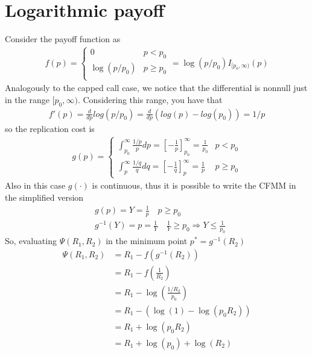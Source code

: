 \documentclass[12pt]{article}
\begin{document}
\section{Logarithmic payoff}
Consider the payoff function as
\begin{align*}
    f(p)=\begin{cases}
             0           & p<p_0     \\
             \log(p/p_0) & p\geq p_0 \\
         \end{cases} = \log(p/p_0) I_{[p_0,\infty)}(p)
\end{align*}
Analogously to the capped call case, we notice that the differential is nonnull just in the range $[p_0,\infty)$. Considering this range, you have that
\begin{align*}
    f'(p) =\frac{d}{dp} log(p/p_0) = \frac{d}{dp}\left(log(p)-log(p_0)\right) = 1/p
\end{align*}
so the replication cost is
\begin{align*}
    g(p) = \begin{cases}
               \int^\infty_{p_0} \frac{1/p}{p}dp = \left[-\frac{1}{p}\right]^\infty_{p_0} =\frac{1}{p_0} & p<p_0     \\
               \int^\infty_{p} \frac{1/q}{q}dq= \left[-\frac{1}{q}\right]^\infty_{p} =\frac{1}{p}        & p\geq p_0
           \end{cases}
\end{align*}
Also in this case $g(\cdot)$ is continuous, thus it is possible to write the CFMM in the simplified version
\begin{align*}
     & g(p) = Y = \frac{1}{p} \quad p\geq p_0                                                \\
     & g^{-1}(Y) =p =  \frac{1}{Y} \quad \frac{1}{Y}\geq p_0 \Rightarrow Y\leq \frac{1}{p_0}
\end{align*}
So, evaluating $\Psi(R_1,R_2)$ in the minimum point $p^*=g^{-1}(R_2)$
\begin{align*}
    \Psi(R_1,R_2) & = R_1 - f(g^{-1}(R_2))                     \\
                  & = R_1 - f\left(\frac{1}{R_2}\right)        \\
                  & = R_1 - \log\left(\frac{1/R_2}{p_0}\right) \\
                  & = R_1 - \left(\log(1) -\log(p_0R_2)\right) \\
                  & = R_1 + \log(p_0R_2)                       \\
                  & = R_1 + \log(p_0) + \log(R_2)              \\
\end{align*}
\end{document}
